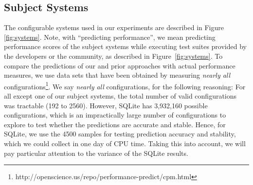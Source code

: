 \documentclass{sig-alternative}
\begin{document}
\subsection{Subject Systems}

The configurable systems used in our experiments are described in Figure \ref{fig:systems}.
Note, with ``predicting performance'', we 
mean predicting performance scores of the subject systems while executing test suites provided by the developers or the community, as described in Figure~\ref{fig:systems}.
To compare the predictions of our and prior approaches with actual performance measures, we use data sets that have been obtained by
measuring {\em nearly all} configurations\footnote{http://openscience.us/repo/performance-predict/cpm.html}.
We say {\em nearly all} configurations, for the following reasoning: For 
all except one of our subject systems, the total number of valid configurations
was tractable (192 to 2560). However,  SQLite has 3,932,160 
possible configurations, which is an impractically large number of configurations to explore to test whether the predictions are accurate and stable. Hence, for SQLite, we use the 4500 samples for testing prediction accuracy and stability, which we could collect in one day of CPU time. Taking this into account, we will pay particular attention to the variance of the SQLite results.
\end{document}
